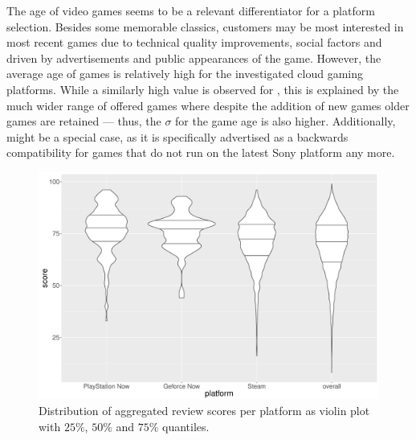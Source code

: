 The age of video games seems to be a relevant differentiator for a platform selection. Besides some memorable classics, customers may be most interested in most recent games due to technical quality improvements, social factors  and driven by advertisements and public appearances of the game. However, the average age of games is relatively high for the investigated cloud gaming platforms. While a similarly high value is observed for \steam, this is explained by the much wider range of offered games where despite the addition of new games older games are retained --- thus, the $\sigma$ for the game age is also higher. Additionally, \psnow might be a special case, as it is specifically advertised as a backwards compatibility for games that do not run on the latest Sony platform any more.%



 
\begin{figure}[!t]
	\centering
	\includegraphics[width=1.0\columnwidth]{images/scores-by-platform-violin.pdf}
	\caption{Distribution of aggregated review scores per platform as violin plot with $25\%$, $50\%$ and $75\%$ quantiles.}
\label{fig:scores-by-platform}
\end{figure}

